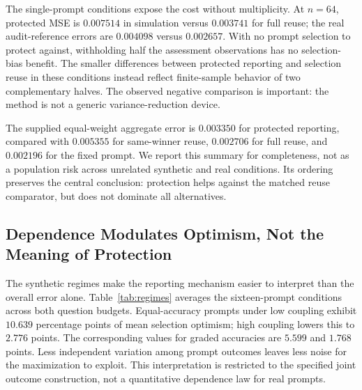 \documentclass{article}
\begin{document}
\begin{table}[t]
\caption{Mean error $\times10^3$ across seeds. Synthetic entries use known truth; real entries use finite audit accuracy. Reuse means same-winner selection-score reuse; Full selects and reports on all questions; Half is the alternative protected split. Fixed and Random also use all questions. Different selectors can have different targets, so this is not a ranking of answer accuracy.}
\label{tab:main}
\centering\small
\setlength{\tabcolsep}{4pt}

\end{table}

The single-prompt conditions expose the cost without multiplicity. At $n=64$, protected MSE is $0.007514$ in simulation versus $0.003741$ for full reuse; the real audit-reference errors are $0.004098$ versus $0.002657$. With no prompt selection to protect against, withholding half the assessment observations has no selection-bias benefit. The smaller differences between protected reporting and selection reuse in these conditions instead reflect finite-sample behavior of two complementary halves. The observed negative comparison is important: the method is not a generic variance-reduction device.

The supplied equal-weight aggregate error is $0.003350$ for protected reporting, compared with $0.005355$ for same-winner reuse, $0.002706$ for full reuse, and $0.002196$ for the fixed prompt. We report this summary for completeness, not as a population risk across unrelated synthetic and real conditions. Its ordering preserves the central conclusion: protection helps against the matched reuse comparator, but does not dominate all alternatives.

\subsection{Dependence Modulates Optimism, Not the Meaning of Protection}
The synthetic regimes make the reporting mechanism easier to interpret than the overall error alone. Table~\ref{tab:regimes} averages the sixteen-prompt conditions across both question budgets. Equal-accuracy prompts under low coupling exhibit $10.639$ percentage points of mean selection optimism; high coupling lowers this to $2.776$ points. The corresponding values for graded accuracies are $5.599$ and $1.768$ points. Less independent variation among prompt outcomes leaves less noise for the maximization to exploit. This interpretation is restricted to the specified joint outcome construction, not a quantitative dependence law for real prompts.
\end{document}
